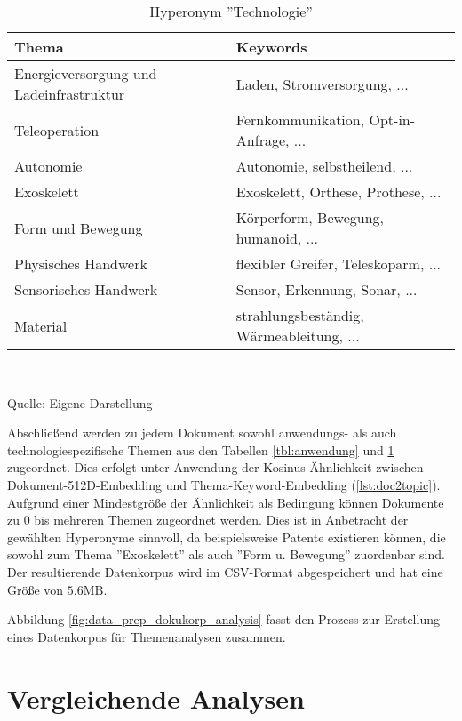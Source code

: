\begin{table}[H]
	\caption{Hyperonym ''Technologie''}
	\label{tbl:technology}
	\begin{tabularx}{\textwidth}{X|X}
		\hline
		\textbf{Thema} & \textbf{Keywords} \\
		\hline
		Energieversorgung und Ladeinfrastruktur & Laden, Stromversorgung, ... \\
		\hline
		Teleoperation & Fernkommunikation, Opt-in-Anfrage, ... \\
		\hline
		Autonomie & Autonomie, selbstheilend, ... \\
		\hline
		Exoskelett & Exoskelett, Orthese, Prothese, ... \\
		\hline
		Form und Bewegung & Körperform, Bewegung, humanoid, ... \\
		\hline
		Physisches Handwerk & flexibler Greifer, Teleskoparm, ... \\
		\hline
		Sensorisches Handwerk & Sensor, Erkennung, Sonar, ... \\
		\hline
		Material & strahlungsbeständig, Wärmeableitung, ... \\
		\hline
	\end{tabularx} \\
	\vspace{0.5em}
	\raggedright
	\normalsize{Quelle: Eigene Darstellung}
	\vspace{-1.0em}
\end{table}
Abschließend werden zu jedem Dokument sowohl anwendungs- als auch technologiespezifische Themen aus den Tabellen \ref{tbl:anwendung} und \ref{tbl:technology} zugeordnet. Dies erfolgt unter Anwendung der Kosinus-Ähnlichkeit zwischen Dokument-512D-Embedding und Thema-Keyword-Embedding (\ref{lst:doc2topic}). Aufgrund einer Mindestgröße der Ähnlichkeit als Bedingung können Dokumente zu 0 bis mehreren Themen zugeordnet werden. Dies ist in Anbetracht der gewählten Hyperonyme sinnvoll, da beispielsweise Patente existieren können, die sowohl zum Thema ''Exoskelett'' als auch ''Form u. Bewegung'' zuordenbar sind. Der resultierende Datenkorpus wird im CSV-Format abgespeichert und hat eine Größe von $5.6\text{MB}$.

Abbildung \ref{fig:data_prep_dokukorp_analysis} fasst den Prozess zur Erstellung eines Datenkorpus für Themenanalysen zusammen. 


\newpage
\section{Vergleichende Analysen}\label{sec:analysis}

